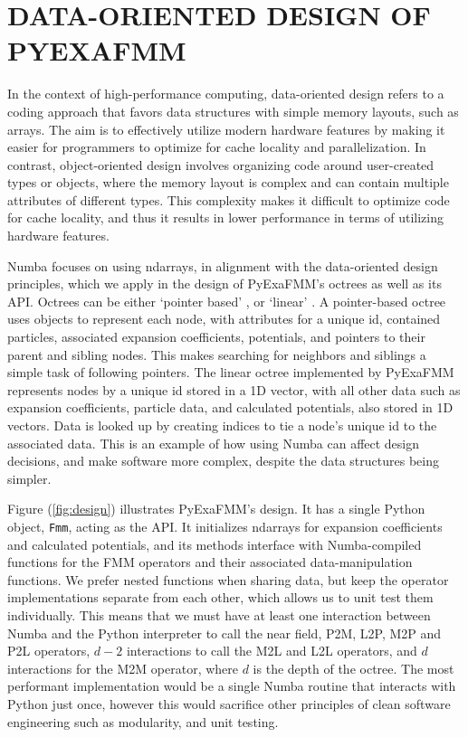 \documentclass{IEEEcsmag}
\begin{document}
\section{DATA-ORIENTED DESIGN OF PYEXAFMM}

In the context of high-performance computing, data-oriented design refers to a coding approach that favors data structures with simple memory layouts, such as arrays. The aim is to effectively utilize modern hardware features by making it easier for programmers to optimize for cache locality and parallelization.
In contrast, object-oriented design involves organizing code around user-created types or objects, where the memory layout is complex and can contain multiple attributes of different types. 
This complexity makes it difficult to optimize code for cache locality, and thus it results in lower performance in terms of utilizing hardware features.

Numba focuses on using ndarrays, in alignment with the data-oriented design principles, which we apply in the design of PyExaFMM's octrees as well as its API.
Octrees can be either `pointer based' \cite{Wang2021}, or `linear' \cite{Sundar2007}. A pointer-based octree uses objects to represent each node, with attributes for a unique id, contained particles, associated expansion coefficients, potentials, and pointers to their parent and sibling nodes. This makes searching for neighbors and siblings a simple task of following pointers. The linear octree implemented by PyExaFMM represents nodes by a unique id stored in a 1D vector, with all other data such as expansion coefficients, particle data, and calculated potentials, also stored in 1D vectors. Data is looked up by creating indices to tie a node's unique id to the associated data. This is an example of how using Numba can affect design decisions, and make software more complex, despite the data structures being simpler.

Figure (\ref{fig:design}) illustrates PyExaFMM's design. It has a single Python object, \texttt{Fmm}, acting as the API. It initializes ndarrays for expansion coefficients and calculated potentials, and its methods interface with Numba-compiled functions for the FMM operators and their associated data-manipulation functions. We prefer nested functions when sharing data, but keep the operator implementations separate from each other, which allows us to unit test them individually. This means that we must have at least one interaction between Numba and the Python interpreter to call the near field, P2M, L2P, M2P and P2L operators, $d-2$ interactions to call the  M2L and L2L operators, and $d$ interactions for the M2M operator, where $d$ is the depth of the octree. The most performant implementation would be a single Numba routine that interacts with Python just once, however this would sacrifice other principles of clean software engineering such as modularity, and unit testing.
\end{document}
